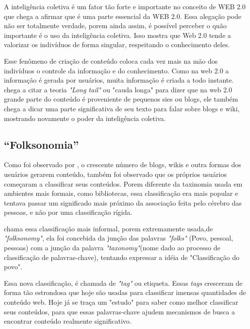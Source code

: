 \documentclass[
	12pt,				%
	openright,			%
	twoside,			%
	a4paper,			%
	Times,
	brazil,				%
	]{abntex2}
\begin{document}
A inteligência coletiva é um fator tão forte e importante no conceito de WEB 2.0 que  chega a afirmar que é uma parte essencial da WEB 2.0. Essa alegação pode não ser totalmente verdade, porem ainda assim, é possível perceber o quão importante é o uso da inteligência coletiva. Isso mostra que Web 2.0 tende a valorizar os indivíduos de forma singular, respeitando o conhecimento deles.
\par

Esse fenômeno de criação de conteúdo coloca cada vez mais na mão dos indivíduos o controle da informação e do conhecimento. Como na web 2.0 a informação é gerada por usuários, muita informação é criada a todo instante.  chega a citar a teoria \textit{"Long tail"} ou "cauda longa" para dizer que na web 2.0 grande parte do conteúdo é proveniente de pequenos sies ou blogs, ele também chega a dicar uma parte significativa de seu texto para falar sobre blogs e wiki, mostrando novamente o poder da inteligência coletiva.
\par

\subsection{“Folksonomia”}


Como foi observado por , o crescente número de blogs, wikis e outra formas dos usuários gerarem conteúdo, também foi observado que os próprios usuários começaram a classificar seus conteúdos. Porem diferente da taxinomia usada em ambientes mais formais, como bibliotecas, essa classificação era mais popular e tentava passar um significado mais próximo da associação feita pelo cérebro das pessoas, e não por uma classificação rígida.
\par

 chama essa classificação mais informal, porem extremamente usada,de \textit{"folksonomy"}, ela foi concebida da junção das palavras \textit{"folks"} (Povo, pessoal, pessoas) com a junção da palavra \textit{"taxonomy"}(nome dado ao processo de classificação de palavras-chave), tentando expressar a idéia de "Classificação do povo".\cite{tag-2}
\par 

Essa nova classificação, é chamada de \textit{"tag"} ou etiqueta. Essas \textit{tags} cresceram de forma tão estrondosa que hoje são usadas para classificar imensas quantidades de conteúdo web. Hoje já se traça um "estudo" para saber como melhor classificar seus conteúdos, para que essas palavras-chave ajudem mecanismos de busca a encontrar conteúdo realmente significativo.\cite{web2.0, tag, tag-2}
\par
\end{document}
